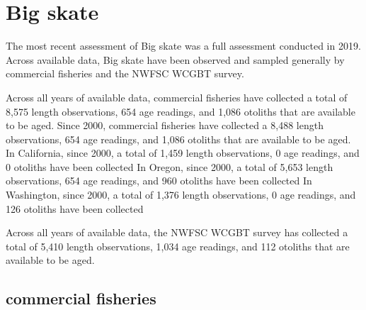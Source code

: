 \documentclass[11pt,
  english,
  letterpaper,
]{article}
\begin{document}

\hypertarget{big-skate}{%
\section{Big skate}\label{big-skate}}

\leavevmode\tagmcend\tagstructend


The most recent assessment of Big skate was a full assessment conducted in 2019. Across available data, Big skate have been observed and sampled generally by commercial fisheries and the NWFSC WCGBT survey.

\leavevmode\tagmcend\tagstructend\par


Across all years of available data, commercial fisheries have collected a total of 8,575 length observations, 654 age readings, and 1,086 otoliths that are available to be aged. Since 2000, commercial fisheries have collected a 8,488 length observations, 654 age readings, and 1,086 otoliths that are available to be aged. In California, since 2000, a total of 1,459 length observations, 0 age readings, and 0 otoliths have been collected In Oregon, since 2000, a total of 5,653 length observations, 654 age readings, and 960 otoliths have been collected In Washington, since 2000, a total of 1,376 length observations, 0 age readings, and 126 otoliths have been collected

\leavevmode\tagmcend\tagstructend\par


Across all years of available data, the NWFSC WCGBT survey has collected a total of 5,410 length observations, 1,034 age readings, and 112 otoliths that are available to be aged.

\leavevmode\tagmcend\tagstructend\par


\hypertarget{commercial-fisheries-3}{%
\subsection{commercial fisheries}\label{commercial-fisheries-3}}

\leavevmode\tagmcend\tagstructend
\end{document}
